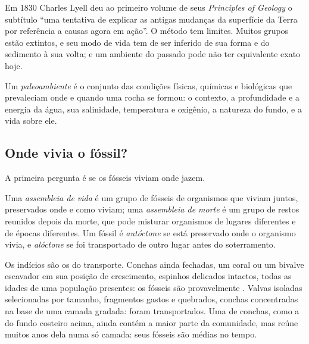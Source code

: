 Em 1830 Charles Lyell deu ao primeiro volume de seus \emph{Principles of Geology} o subtítulo ``uma
tentativa de explicar as antigas mudanças da superfície da Terra por referência a causas agora em
ação''. O método tem limites. Muitos grupos estão extintos, e seu modo de vida tem de ser
inferido de sua forma e do sedimento à sua volta; e um ambiente do passado pode
não ter equivalente exato hoje.

\begin{definition}[Paleoambiente]\label{def:b2:palaeoenvironments:palaeoenvironment}
Um \emph{paleoambiente} é o conjunto das condições físicas, químicas e
biológicas que prevaleciam onde e quando uma rocha se formou: o contexto, a profundidade e a
energia da água, sua salinidade, temperatura e oxigênio, a natureza do fundo, e a vida
sobre ele.
\end{definition}

\subsection*{Onde vivia o fóssil?}

A primeira pergunta é se os fósseis viviam onde jazem.

\begin{definition}\label{def:b2:palaeoenvironments:assemblages}
Uma \emph{assembleia de vida} é um grupo de fósseis de organismos que viviam
juntos, preservados onde e como viviam; uma \emph{assembleia de morte} é
um grupo de restos reunidos depois da morte, que pode misturar organismos de lugares diferentes
e de épocas diferentes. Um fóssil é \emph{autóctone} se está
preservado onde o organismo vivia, e \emph{alóctone} se foi
transportado de outro lugar antes do soterramento.
\end{definition}

Os indícios são os do transporte. Conchas ainda fechadas, um coral ou um bivalve escavador em sua
posição de crescimento, espinhos delicados intactos, todas as idades de uma população presentes: os fósseis são
provavelmente . Valvas isoladas selecionadas por tamanho, fragmentos gastos e quebrados, conchas
concentradas na base de uma camada gradada: foram transportados. Uma  de conchas, como
a do fundo costeiro acima, ainda contém a maior parte da comunidade, mas reúne muitos anos
dela numa só camada: seus fósseis são médias no tempo.

